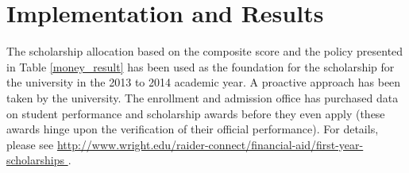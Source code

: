 \documentclass[12pt,english]{report}
\begin{document}

\section{Implementation and Results}
The scholarship allocation based on the composite score and the policy
presented in Table \ref{money_result} has been used as the foundation for the
scholarship for the university in the 2013 to 2014 academic year.  A proactive
approach has been taken by the university. The enrollment and admission office
has purchased data on student performance and  scholarship awards before they
even apply (these awards hinge upon the verification of their official
performance). For details, please see
\url{http://www.wright.edu/raider-connect/financial-aid/first-year-scholarships
}.
\end{document}

